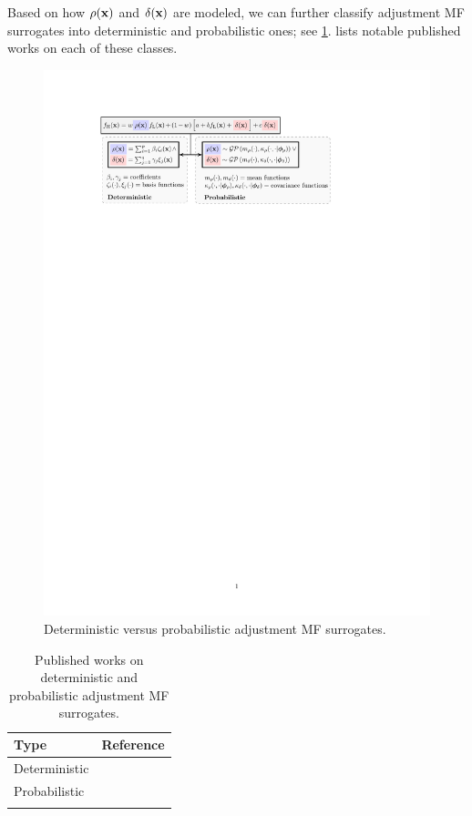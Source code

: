 \documentclass[journal ]{new-aiaa}
\begin{document}
	Based on how $\rho({\bf {x}})$ and $\delta({\bf{x}})$ are modeled, we can further classify adjustment MF surrogates into deterministic and probabilistic ones; see \cref{Fig-4}.
	 lists notable published works on each of these classes.
	
	\begin{figure}
		\centering
		\includegraphics[scale=0.92]{Fig4.pdf}
		\caption{Deterministic versus probabilistic adjustment MF surrogates.}
		\label{Fig-4}
	\end{figure}
	
	\begin{table}
		\caption{Published works on deterministic and probabilistic adjustment MF surrogates.}
		\label{Table2}
		\centering
		\begin{tabularx}{\textwidth}{lX}
			\hline \noalign{\smallskip}
			Type & Reference\\
			\hline \noalign{\smallskip}
			Deterministic & \citet{ZhangYiming2018,FernandezGodino2019,Song2019,Kou2019,Durantin2017,Han2013,Tyan2015,Nguyen2015,Palar2016,LiuB2016,LYan2019,Rumpfkeil2017,Rumpfkeil2019,Wang2021}  \\
			\noalign{\smallskip}
			Probabilistic &    \citet{Kennedy2000,Forrester2007,Xiong2008,Kuya2011,Toal2011,Han2012,Keane2012,Goh2013,Park2017,Serani2019,Qian2008,Gratiet2013,Gratiet2014,Allaire2014,Parussini2017,Zhou2017kbs,Xiao2018,Ji2023}\\
			\hline \noalign{\smallskip}
		\end{tabularx}
	\end{table}
	
\end{document}
